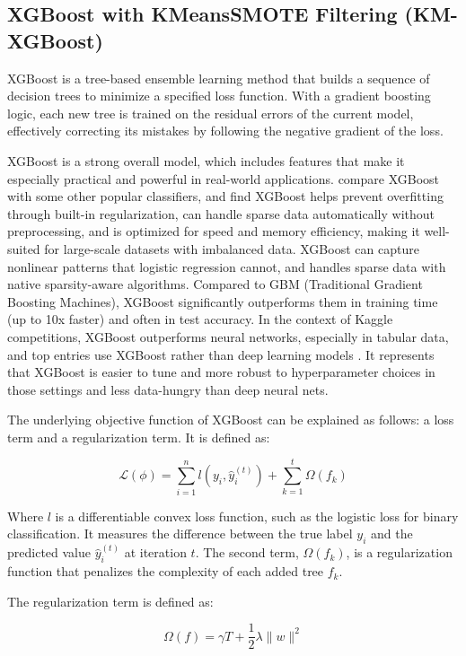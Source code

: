 \subsection{XGBoost with KMeansSMOTE Filtering (KM-XGBoost)}
XGBoost is a tree-based ensemble learning method that builds a sequence of decision trees to minimize a specified loss function. With a gradient boosting logic, each new tree is trained on the residual errors of the current model, effectively correcting its mistakes by following the negative gradient of the loss. 

XGBoost is a strong overall model, which includes features that make it especially practical and powerful in real-world applications. \cite{XGBoost_2016} compare XGBoost with some other popular classifiers, and find XGBoost helps prevent overfitting through built-in regularization, can handle sparse data automatically without preprocessing, and is optimized for speed and memory efficiency, making it well-suited for large-scale datasets with imbalanced data. XGBoost can capture nonlinear patterns that logistic regression cannot, and handles sparse data with native sparsity-aware algorithms. Compared to GBM (Traditional Gradient Boosting Machines), XGBoost significantly outperforms them in training time (up to 10x faster) and often in test accuracy. In the context of Kaggle competitions, XGBoost outperforms neural networks, especially in tabular data, and top entries use XGBoost rather than deep learning models \citep{XGBoost_2016}. It represents that XGBoost is easier to tune and more robust to hyperparameter choices in those settings and less data-hungry than deep neural nets.

The underlying objective function of XGBoost can be explained as follows: a loss term and a regularization term. It is defined as:

\begin{equation}
\mathcal{L}(\phi) = \sum_{i=1}^{n} l(y_i, \hat{y}_i^{(t)}) + \sum_{k=1}^{t} \Omega(f_k)
\end{equation}

Where $l$ is a differentiable convex loss function, such as the logistic loss for binary classification. It measures the difference between the true label $y_i$ and the predicted value $\hat{y}_i^{(t)}$ at iteration $t$. The second term, $\Omega(f_k)$, is a regularization function that penalizes the complexity of each added tree $f_k$.

The regularization term is defined as:

\begin{equation}
\Omega(f) = \gamma T + \frac{1}{2} \lambda \|w\|^2
\end{equation}

